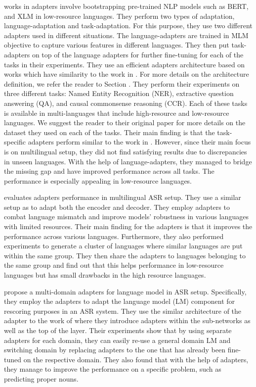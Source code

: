 \cite{pfeiffer2020madx} works in adapters involve bootstrapping pre-trained NLP models such as BERT, and XLM \cite{conneau2019cross} in low-resource languages. They perform two types of adaptation, language-adaptation and task-adaptation. For this purpose, they use two different adapters used in different situations. The language-adapters are trained in MLM objective to capture various features in different languages. They then put task-adapters on top of the language adapters for further fine-tuning for each of the tasks in their experiments. They use an efficient adapters architecture based on \cite{pfeiffer2021adapterfusion} works which have similarity to the work in \cite{bapna2019simple}. For more details on the architecture definition, we refer the reader to Section \label{sec:adapter_place}. They perform their experiments on three different tasks: Named Entity Recognition (NER), extractive question answering (QA), and causal commonsense reasoning (CCR). Each of these tasks is available in multi-languages that include high-resource and low-resource languages. We suggest the reader to their original paper for more details on the dataset they used on each of the tasks. Their main finding is that the task-specific adapters perform similar to the work in \cite{houlsby2019parameter}. However, since their main focus is on multilingual setup, they did not find satisfying results due to discrepancies in unseen languages. With the help of language-adapters, they managed to bridge the missing gap and have improved performance across all tasks. The performance is especially appealing in low-resource languages.

\cite{winata2020adapt} evaluates adapters performance in multilingual ASR setup. They use a similar setup as \cite{bapna2019simple} to adapt both the encoder and decoder. They employ adapters to combat language mismatch and improve models' robustness in various languages with limited resources. Their main finding for the adapters is that it improves the performance across various languages. Furthermore, they also performed experiments to generate a cluster of languages where similar languages are put within the same group. They then share the adapters to languages belonging to the same group and find out that this helps performance in low-resource languages but has small drawbacks in the high resource languages.

\cite{lee2021adaptable} propose a multi-domain adapters for language model in ASR setup. Specifically, they employ the adapters to adapt the language model (LM) component for rescoring purposes in an ASR system. They use the similar architecture of the adapter to the work of \cite{houlsby2019parameter} where they introduce adapters within the sub-networks as well as the top of the layer. Their experiments show that by using separate adapters for each domain, they can easily re-use a general domain LM and switching domain by replacing adapters to the one that has already been fine-tuned on the respective domain. They also found that with the help of adapters, they manage to improve the performance on a specific problem, such as predicting proper nouns.

